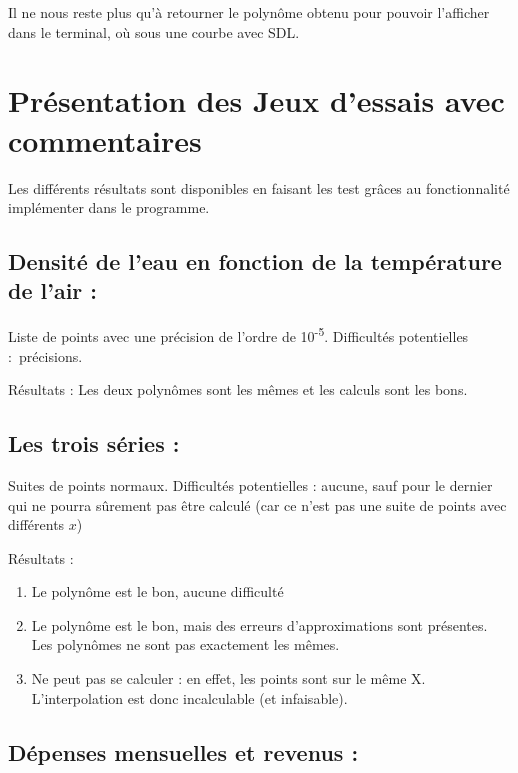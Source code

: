 \documentclass[letter]{article}
\begin{document}
Il ne nous reste plus qu'à retourner le polynôme obtenu pour pouvoir l'afficher  dans le terminal, où sous une courbe avec SDL.

\section{Présentation des Jeux d'essais avec commentaires}
\label{sec:org646d02b}

Les différents résultats sont disponibles en faisant les test grâces au fonctionnalité implémenter dans le programme.


\subsection{Densité de l'eau en fonction de la température de l'air :}
\label{sec:orgf2cd533}

Liste de points avec une précision de l'ordre de 10\textsuperscript{-5}.
Difficultés potentielles : précisions.



Résultats : Les deux polynômes sont les mêmes et les calculs sont les bons.



\subsection{Les trois séries :}
\label{sec:org7e19b3f}

Suites de points normaux.
Difficultés potentielles : aucune, sauf pour le dernier qui ne pourra sûrement pas être calculé (car ce n'est pas une suite de points avec différents \(x\))


Résultats : 

\begin{enumerate}
\item Le polynôme est le bon, aucune difficulté

\item Le polynôme est le bon, mais des erreurs d'approximations sont présentes. Les polynômes ne sont pas exactement les mêmes.

\item Ne peut pas se calculer : en effet, les points sont sur le même X. L'interpolation est donc incalculable (et infaisable).
\end{enumerate}


\subsection{Dépenses mensuelles et revenus :}
\label{sec:orgc24ea3b}
\end{document}
